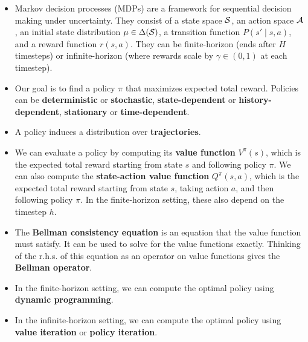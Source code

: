 \documentclass[\main/main]{subfiles}
\begin{document}
\begin{itemize}
    \item Markov decision processes (MDPs) are a framework for sequential decision making under uncertainty. They consist of a state space $\S$, an action space $\A$, an initial state distribution $\mu \in \Delta(\S)$, a transition function $P(s' \mid s, a)$, and a reward function $r(s, a)$. They can be finite-horizon (ends after $H$ timesteps) or infinite-horizon (where rewards scale by $\gamma \in (0, 1)$ at each timestep).
    \item Our goal is to find a policy $\pi$ that maximizes expected total reward. Policies can be \textbf{deterministic} or \textbf{stochastic}, \textbf{state-dependent} or \textbf{history-dependent}, \textbf{stationary} or \textbf{time-dependent}.
    \item A policy induces a distribution over \textbf{trajectories}.
    \item We can evaluate a policy by computing its \textbf{value function} $V^\pi(s)$, which is the expected total reward starting from state $s$ and following policy $\pi$. We can also compute the \textbf{state-action value function} $Q^\pi(s, a)$, which is the expected total reward starting from state $s$, taking action $a$, and then following policy $\pi$. In the finite-horizon setting, these also depend on the timestep $h$.
    \item The \textbf{Bellman consistency equation} is an equation that the value function must satisfy. It can be used to solve for the value functions exactly. Thinking of the r.h.s. of this equation as an operator on value functions gives the \textbf{Bellman operator}.
    \item In the finite-horizon setting, we can compute the optimal policy using \textbf{dynamic programming}.
    \item In the infinite-horizon setting, we can compute the optimal policy using \textbf{value iteration} or \textbf{policy iteration}.
\end{itemize}
\end{document}
